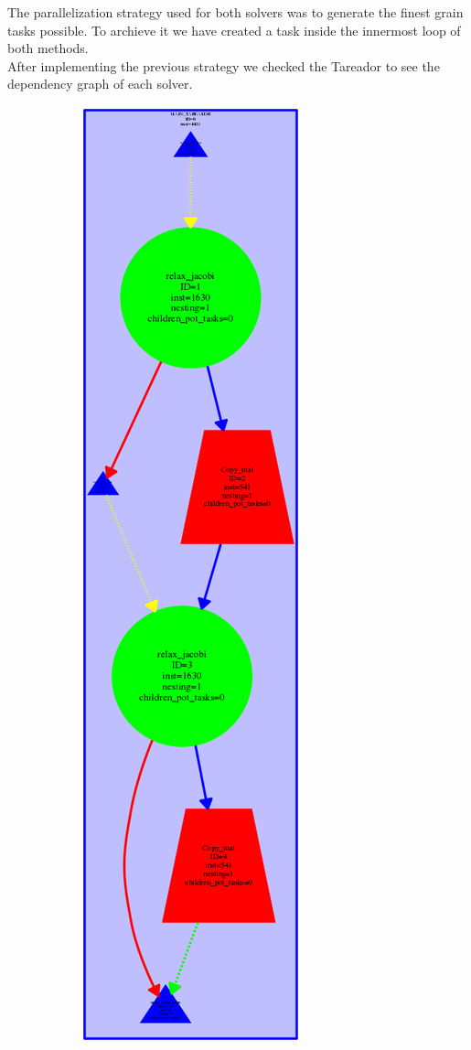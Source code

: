 \documentclass[12]{article}
\begin{document}
\medskip

The parallelization strategy used for both solvers was to generate the finest grain tasks possible. To archieve it we have created a task inside the innermost loop of both methods.
\\
After implementing the previous strategy we checked the Tareador to see the dependency graph of each solver.

\begin{figure}[H]
\begin{subfigure}{.5\textwidth}
    \centering
    \includegraphics[scale=0.30]{images/jacobi.png}

\end{subfigure}
\end{figure}
\end{document}
